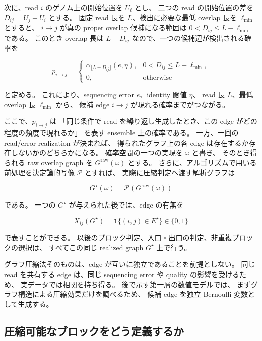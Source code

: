 \documentclass[a4j,10pt]{ujarticle}
\begin{document}
次に、read $i$ のゲノム上の開始位置を $U_i$ とし、
二つの read の開始位置の差を $D_{ij}=U_j-U_i$ とする。
固定 read 長を $L$、検出に必要な最低 overlap 長を $\ell_{\min}$ とすると、
$i\rightarrow j$ が真の proper overlap 候補になる範囲は
$0<D_{ij}\le L-\ell_{\min}$ である。
このとき overlap 長は $L-D_{ij}$ なので、一つの候補辺が検出される確率を

\begin{equation}
p_{i\rightarrow j}
=
\begin{cases}
\alpha_{\lfloor L-D_{ij}\rfloor}(e,\eta),
& 0<D_{ij}\le L-\ell_{\min},\\
0,
& \text{otherwise}
\end{cases}
\label{eq:edge_probability_ch5}
\end{equation}

と定める。
これにより、sequencing error $e$、identity 閾値 $\eta$、
read 長 $L$、最低 overlap 長 $\ell_{\min}$ から、
候補 edge $i\rightarrow j$ が現れる確率までがつながる。

ここで、$p_{i\rightarrow j}$ は
「同じ条件で read を繰り返し生成したとき、この edge がどの程度の頻度で現れるか」
を表す ensemble 上の確率である。
一方、一回の read/error realization が決まれば、
得られたグラフ上の各 edge は存在するか存在しないかのどちらかになる。
確率空間の一つの実現を $\omega$ と書き、
そのとき得られる raw overlap graph を
$G^{\mathrm{raw}}(\omega)$ とする。
さらに、アルゴリズムで用いる前処理を決定論的写像 $\mathcal P$ とすれば、
実際に圧縮判定へ渡す解析グラフは

\[
G^\star(\omega)
=
\mathcal P\!\left(G^{\mathrm{raw}}(\omega)\right)
\]

である。
一つの $G^\star$ が与えられた後では、edge の有無を

\[
X_{ij}(G^\star)
=
\mathbf 1\{(i,j)\in E^\star\}
\in\{0,1\}
\]

で表すことができる。
以後のブロック判定、入口・出口の判定、非重複ブロックの選択は、
すべてこの同じ realized graph $G^\star$ 上で行う。

グラフ圧縮法そのものは、edge が互いに独立であることを前提としない。
同じ read を共有する edge は、同じ sequencing error や quality の影響を受けるため、
実データでは相関を持ち得る。
後で示す第一層の数値モデルでは、
まずグラフ構造による圧縮効果だけを調べるため、
候補 edge を独立 Bernoulli 変数として生成する。


\subsection{圧縮可能なブロックをどう定義するか}
\label{subsec:block_probability}
\end{document}
